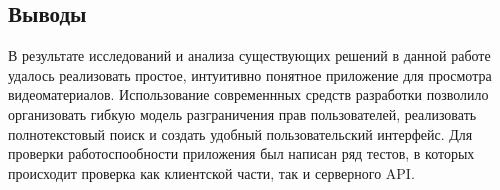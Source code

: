 \subsection{Выводы}

В результате исследований и анализа существующих решений в данной работе удалось
реализовать простое, интуитивно понятное приложение для просмотра
видеоматериалов. Использование современнных средств разработки позволило организовать
гибкую модель разграничения прав пользователей, реализовать полнотекстовый поиск и
создать удобный пользовательский интерфейс. Для проверки работоспообности приложения
был написан ряд тестов, в которых происходит проверка как клиентской части, так и серверного
API.